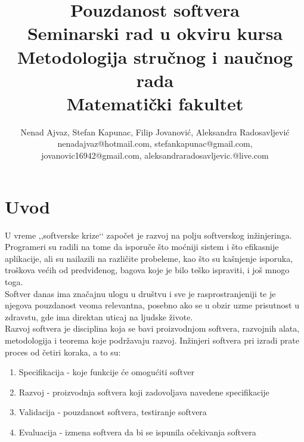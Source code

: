 \documentclass[a4paper]{article}
\begin{document}
\title{Pouzdanost softvera\\ \small{Seminarski rad u okviru kursa\\Metodologija stručnog i naučnog rada\\ Matematički fakultet}}

\author{Nenad Ajvaz, Stefan Kapunac, Filip Jovanović, Aleksandra Radosavljević\\ nenadajvaz@hotmail.com, stefankapunac@gmail.com, \\jovanovic16942@gmail.com, aleksandraradosavljevic.@live.com}


\maketitle


\tableofcontents

\newpage

\section{Uvod}
\label{sec:uvod}

U vreme ,,softverske krize‘‘ započet je razvoj na polju softverskog inžinjeringa. Programeri su radili na tome da isporuče što moćniji sistem i što efikasnije aplikacije, ali su nailazili na različite probeleme, kao što su kašnjenje isporuka, troškova većih od predviđenog, bagova koje je bilo teško ispraviti, i još mnogo toga.\\
Softver danas ima značajnu ulogu u društvu i sve je rasprostranjeniji te je njegova pouzdanost veoma relevantna, posebno ako se u obzir uzme prisutnost u zdravstu, gde ima direktan uticaj na ljudske živote.\\

Razvoj softvera je disciplina koja se bavi proizvodnjom softvera, razvojnih alata, metodologija i teorema koje podržavaju razvoj. Inžinjeri softvera pri izradi prate proces od četiri koraka, a to su:
\begin{enumerate}
	\item Specifikacija - koje funkcije će omogućiti softver
	\item Razvoj - proizvodnja softvera koji zadovoljava navedene specifikacije
	\item Validacija - pouzdanost softvera, testiranje softvera
	\item Evaluacija - izmena softvera da bi se ispunila očekivanja softvera
\end{enumerate}
\end{document}
